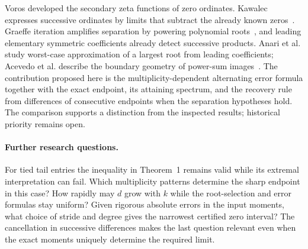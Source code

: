 \documentclass[11pt]{article}
\begin{document}
Voros developed the secondary zeta functions of zero ordinates.
Kawalec expresses successive ordinates by limits that subtract the already
known zeros~\cite{voros,kawalec}. Graeffe iteration amplifies separation
by powering polynomial roots~\cite{graeffe}, and leading elementary symmetric
coefficients already detect successive products. Anari et al. study
worst-case approximation of a largest root from leading coefficients;
Acevedo et al. describe the boundary geometry of power-sum images~\cite{anari,acevedo}.
The contribution proposed here is the multiplicity-dependent alternating
error formula together with the exact endpoint, its attaining spectrum, and
the recovery rule from differences of consecutive endpoints when the separation
hypotheses hold. The comparison supports a distinction from the inspected
results; historical priority remains open.

\paragraph{Further research questions.}
For tied tail entries the inequality in Theorem~1 remains valid while its
extremal interpretation can fail. Which multiplicity patterns determine the
sharp endpoint in this case? How rapidly may $d$ grow with $k$ while the
root-selection and error formulas stay uniform? Given rigorous absolute
errors in the input moments, what choice of stride and degree gives the
narrowest certified zero interval? The cancellation in successive differences
makes the last question relevant even when the exact moments uniquely
determine the required limit.
\end{document}
